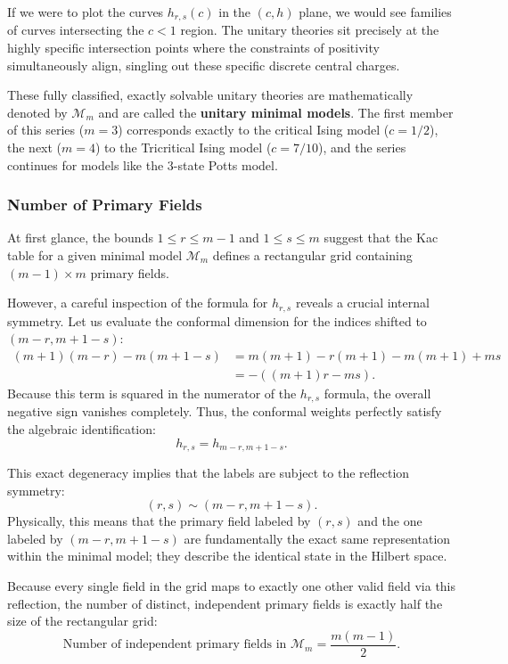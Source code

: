 If we were to plot the curves \(h_{r,s}(c)\) in the \((c, h)\) plane, we would see families of curves intersecting the \(c < 1\) region. The unitary theories sit precisely at the highly specific intersection points where the constraints of positivity simultaneously align, singling out these specific discrete central charges.

These fully classified, exactly solvable unitary theories are mathematically denoted by \(\mathcal{M}_m\) and are called the \textbf{unitary minimal models}. The first member of this series (\(m=3\)) corresponds exactly to the critical Ising model (\(c=1/2\)), the next (\(m=4\)) to the Tricritical Ising model (\(c=7/10\)), and the series continues for models like the 3-state Potts model.

\subsubsection{Number of Primary Fields}

At first glance, the bounds \(1 \le r \le m-1\) and \(1 \le s \le m\) suggest that the Kac table for a given minimal model \(\mathcal{M}_m\) defines a rectangular grid containing \((m-1) \times m\) primary fields.

However, a careful inspection of the formula for \(h_{r,s}\) reveals a crucial internal symmetry. Let us evaluate the conformal dimension for the indices shifted to \((m-r, m+1-s)\):
\[
    \begin{aligned}
        (m+1)(m-r) - m(m+1-s) & = m(m+1) - r(m+1) - m(m+1) + ms \\
                              & = -( (m+1)r - ms ).
    \end{aligned}
\]
Because this term is squared in the numerator of the \(h_{r,s}\) formula, the overall negative sign vanishes completely. Thus, the conformal weights perfectly satisfy the algebraic identification:
\[
    h_{r,s} = h_{m-r, m+1-s}.
\]

This exact degeneracy implies that the labels are subject to the reflection symmetry:
\[
    (r, s) \sim (m - r, m + 1 - s).
\]
Physically, this means that the primary field labeled by \((r,s)\) and the one labeled by \((m-r, m+1-s)\) are fundamentally the exact same representation within the minimal model; they describe the identical state in the Hilbert space.

Because every single field in the grid maps to exactly one other valid field via this reflection, the number of distinct, independent primary fields is exactly half the size of the rectangular grid:
\[
    \text{Number of independent primary fields in } \mathcal{M}_m = \frac{m(m - 1)}{2}.
\]

